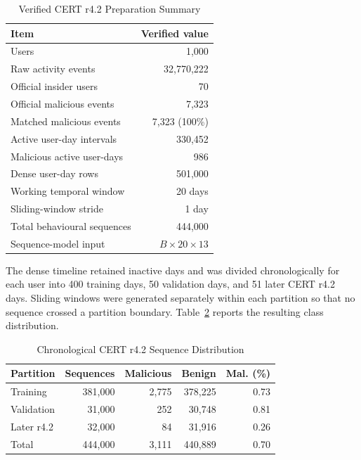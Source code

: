 \begin{table}[!tbp]
\caption{Verified CERT r4.2 Preparation Summary}
\label{tab:dataset_sequence_summary}
\centering
\footnotesize
\renewcommand{\arraystretch}{1.08}
\setlength{\tabcolsep}{2pt}
\begin{tabular*}{\columnwidth}
{@{\extracolsep{\fill}}lr@{}}
\hline
\textbf{Item} & \textbf{Verified value} \\
\hline
Users & 1,000 \\
Raw activity events & 32,770,222 \\
Official insider users & 70 \\
Official malicious events & 7,323 \\
Matched malicious events & 7,323 (100\%) \\
Active user-day intervals & 330,452 \\
Malicious active user-days & 986 \\
Dense user-day rows & 501,000 \\
Working temporal window & 20 days \\
Sliding-window stride & 1 day \\
Total behavioural sequences & 444,000 \\
Sequence-model input & \(B\times20\times13\) \\
\hline
\end{tabular*}
\end{table}

The dense timeline retained inactive days and was divided chronologically
for each user into 400 training days, 50 validation days, and 51 later
CERT r4.2 days. Sliding windows were generated separately within each
partition so that no sequence crossed a partition boundary.
Table~\ref{tab:sequence_distribution_results} reports the resulting class
distribution.

\begin{table}[!tbp]
\caption{Chronological CERT r4.2 Sequence Distribution}
\label{tab:sequence_distribution_results}
\centering
\footnotesize
\renewcommand{\arraystretch}{1.08}
\setlength{\tabcolsep}{2pt}
\begin{tabular*}{\columnwidth}
{@{\extracolsep{\fill}}lrrrr@{}}
\hline
\textbf{Partition} &
\textbf{Sequences} &
\textbf{Malicious} &
\textbf{Benign} &
\textbf{Mal. (\%)} \\
\hline
Training & 381,000 & 2,775 & 378,225 & 0.73 \\
Validation & 31,000 & 252 & 30,748 & 0.81 \\
Later r4.2 & 32,000 & 84 & 31,916 & 0.26 \\
Total & 444,000 & 3,111 & 440,889 & 0.70 \\
\hline
\end{tabular*}
\end{table}

